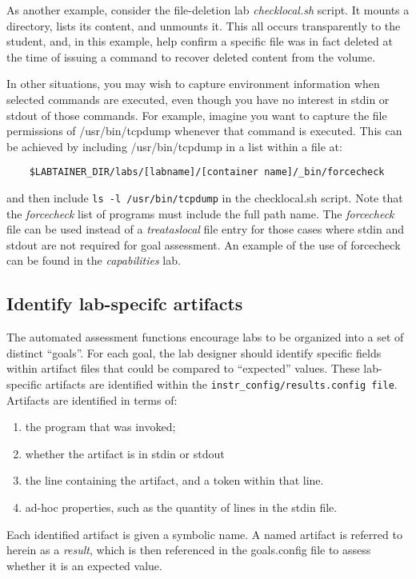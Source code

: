 \documentclass[12pt]{article}
\begin{document}
As another example, consider the file-deletion lab \textit{checklocal.sh} script.
It mounts a directory, lists its content, and unmounts it.  This all occurs 
transparently to the student, and, in this example, help confirm a specific file
was in fact deleted at the time of issuing a command to recover deleted content from
the volume.

In other situations, you may wish to capture environment information when selected
commands are executed, even though you have no interest in stdin or stdout of those
commands.  For example, imagine you want to capture the file permissions of /usr/bin/tcpdump
whenever that command is executed.  This can be achieved by including /usr/bin/tcpdump in a
list within a file at:
\begin{verbatim}
    $LABTAINER_DIR/labs/[labname]/[container name]/_bin/forcecheck
\end{verbatim}
\noindent and then include \texttt{ls -l /usr/bin/tcpdump} in the checklocal.sh script.
Note that the \textit{forcecheck} list of programs must include the full path name.
The \textit{forcecheck} file can be used instead of a \textit{treataslocal} file entry
for those cases where stdin and stdout are not required for goal assessment.  An example of the use of
forcecheck can be found in the \textit{capabilities} lab.  

\subsection{Identify lab-specifc artifacts}
The automated assessment functions encourage labs to be organized into a set of distinct ``goals''.
For each goal, the lab designer should identify specific fields within artifact files that
could be compared to ``expected'' values.  These lab-specific artifacts are identified within the
\texttt{instr\_config/results.config file}.  Artifacts are identified in terms of:
\begin{enumerate}
\item the program that was invoked;
\item whether the artifact is in stdin or stdout
\item the line containing the artifact, and a token within that line.
\item ad-hoc properties, such as the quantity of lines in the stdin file.
\end{enumerate}

Each identified artifact is given a symbolic name. A named artifact is referred to herein as a \textit{result}, which 
is then referenced in the goals.config file to assess whether it is an expected value.
\end{document}
